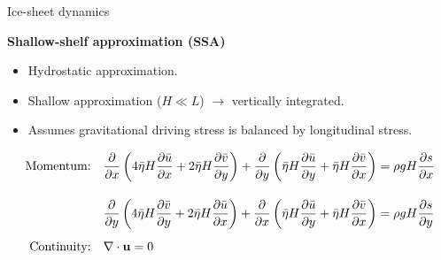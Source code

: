 \documentclass[aspectratio=169,xcolor=dvipsnames]{beamer}
\begin{document}
\begin{frame}[t]{Ice-sheet dynamics}

    \vspace{-1.0em}

    \begin{center}
    \textbf{{\large
    Shallow-shelf approximation (SSA)
    }}
    \end{center}
    
    \small 
    \center 
    
    \vspace{-0.5em}
     
    \begin{itemize}
        \item Hydrostatic approximation.
        \item Shallow approximation ($H \ll L$) $\rightarrow$ vertically integrated.
        \item Assumes gravitational driving stress is balanced by longitudinal stress.
    \end{itemize}

    \begin{align*}
        \text{Momentum:}& \quad 
        \pdv{}{x} \left( 4\bar{\eta}H\pdv{\bar{u}}{x} + 2\bar{\eta}H \pdv{\bar{v}}{y} \right) +
        \pdv{}{y} \left( \bar{\eta}H\pdv{\bar{u}}{y} + \bar{\eta}H\pdv{\bar{v}}{x} \right) =
        \rho g H \pdv{s}{x} \\[1em]
        & \quad
        \pdv{}{y} \left( 4\bar{\eta}H\pdv{\bar{v}}{y} + 2\bar{\eta}H\pdv{\bar{u}}{x} \right) +
        \pdv{}{x} \left( \bar{\eta}H\pdv{\bar{u}}{y} + \bar{\eta}H\pdv{\bar{v}}{x} \right)
        =
        \rho g H \pdv{s}{y} \\[0.5em]
        \text{Continuity:}& \quad
        \nabla \cdot \mathbf{u} = 0
    \end{align*}

\end{frame}
\end{document}
